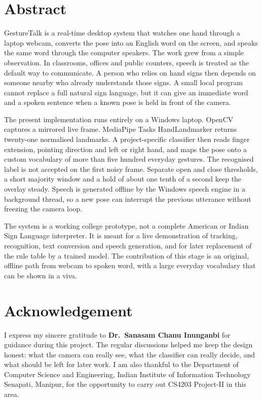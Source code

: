 \documentclass[a4paper,12pt,oneside]{report}
\begin{document}
\newpage

\chapter*{Abstract}
GestureTalk is a real-time desktop system that watches one hand through a laptop webcam, converts the pose into an English word on the screen, and speaks the same word through the computer speakers. The work grew from a simple observation. In classrooms, offices and public counters, speech is treated as the default way to communicate. A person who relies on hand signs then depends on someone nearby who already understands those signs. A small local program cannot replace a full natural sign language, but it can give an immediate word and a spoken sentence when a known pose is held in front of the camera.

The present implementation runs entirely on a Windows laptop. OpenCV captures a mirrored live frame. MediaPipe Tasks HandLandmarker returns twenty-one normalised landmarks. A project-specific classifier then reads finger extension, pointing direction and left or right hand, and maps the pose onto a custom vocabulary of more than five hundred everyday gestures. The recognised label is not accepted on the first noisy frame. Separate open and close thresholds, a short majority window and a hold of about one tenth of a second keep the overlay steady. Speech is generated offline by the Windows speech engine in a background thread, so a new pose can interrupt the previous utterance without freezing the camera loop.

The system is a working college prototype, not a complete American or Indian Sign Language interpreter. It is meant for a live demonstration of tracking, recognition, text conversion and speech generation, and for later replacement of the rule table by a trained model. The contribution of this stage is an original, offline path from webcam to spoken word, with a large everyday vocabulary that can be shown in a viva.

\newpage

\chapter*{Acknowledgement}
I express my sincere gratitude to \textbf{Dr.\ Sanasam Chanu Inunganbi} for guidance during this project. The regular discussions helped me keep the design honest: what the camera can really see, what the classifier can really decide, and what should be left for later work. I am also thankful to the Department of Computer Science and Engineering, Indian Institute of Information Technology Senapati, Manipur, for the opportunity to carry out CS4203 Project-II in this area.
\end{document}
